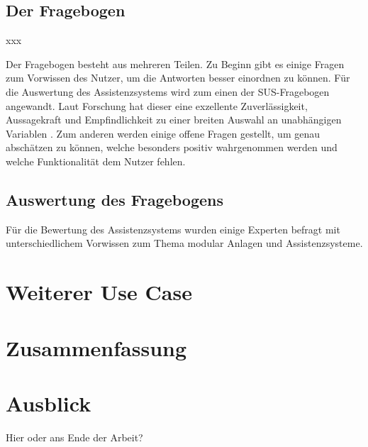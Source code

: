 \subsection{Der Fragebogen}
xxx

Der Fragebogen besteht aus mehreren Teilen. Zu Beginn gibt es einige Fragen zum Vorwissen des Nutzer, um die Antworten besser einordnen zu können. Für die Auswertung des Assistenzsystems wird zum einen der SUS-Fragebogen angewandt. Laut Forschung hat dieser eine \glqq exzellente Zuverlässigkeit, Aussagekraft und Empfindlichkeit zu einer breiten Auswahl an unabhängigen Variablen\grqq \cite[1150]{} . Zum anderen werden einige offene Fragen gestellt, um genau abschätzen zu können, welche  besonders positiv wahrgenommen werden und welche Funktionalität dem Nutzer fehlen. 


\subsection{Auswertung des Fragebogens}
Für die Bewertung des Assistenzsystems wurden einige Experten befragt mit unterschiedlichem Vorwissen zum Thema modular Anlagen und Assistenzsysteme. 

\section{Weiterer Use Case}

\section{Zusammenfassung}

\section{Ausblick}
Hier oder ans Ende der Arbeit?